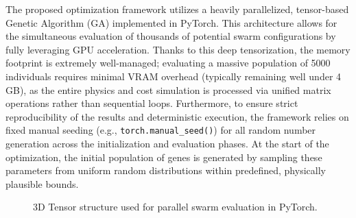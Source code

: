 \documentclass[conference]{IEEEtran}
\begin{document}
The proposed optimization framework utilizes a heavily parallelized, tensor-based Genetic Algorithm (GA) implemented in PyTorch. This architecture allows for the simultaneous evaluation of thousands of potential swarm configurations by fully leveraging GPU acceleration. Thanks to this deep tensorization, the memory footprint is extremely well-managed; evaluating a massive population of 5000 individuals requires minimal VRAM overhead (typically remaining well under 4 GB), as the entire physics and cost simulation is processed via unified matrix operations rather than sequential loops. Furthermore, to ensure strict reproducibility of the results and deterministic execution, the framework relies on fixed manual seeding (e.g., \texttt{torch.manual\_seed()}) for all random number generation across the initialization and evaluation phases. At the start of the optimization, the initial population of genes is generated by sampling these parameters from uniform random distributions within predefined, physically plausible bounds.

\begin{figure}[htbp]
\centering
{}
\caption{3D Tensor structure used for parallel swarm evaluation in PyTorch.}
\label{fig:tensorization}
\end{figure}
\end{document}
